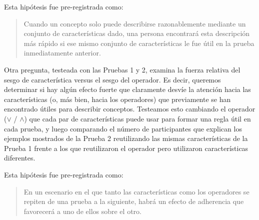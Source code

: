 \begin{hyp}
Esta hipótesis fue pre-registrada como:
\begin{quote}
Cuando un concepto solo puede describirse razonablemente mediante un conjunto de características dado, una persona encontrará esta descripción más rápido si ese mismo conjunto de características le fue útil en la prueba inmediatamente anterior.
\end{quote}
\end{hyp}

\begin{hyp} \label{Hip:StickinessFeatureOperator}
Otra pregunta, testeada con las Pruebas 1 y 2, examina la fuerza relativa del sesgo de característica versus el sesgo del operador. Es decir, queremos determinar si hay algún efecto fuerte que claramente desvíe la atención hacia las características (o, más bien, hacia los operadores) que previamente se han encontrado útiles para describir conceptos. Testeamos esto cambiando el operador ($ \lor $ / $ \land $) que cada par de características puede usar para formar una regla útil en cada prueba, y luego comparando el número de participantes que explican los ejemplos mostrados de la Prueba 2 reutilizando las mismas características de la Prueba 1 frente a los que reutilizaron el operador pero utilizaron características diferentes.

Esta hipótesis fue pre-registrada como:
\begin{quote}
En un escenario en el que tanto las características como los operadores se repiten de una prueba a la siguiente, habrá un efecto de adherencia que favorecerá a uno de ellos sobre el otro.
\end{quote}
\end{hyp}


